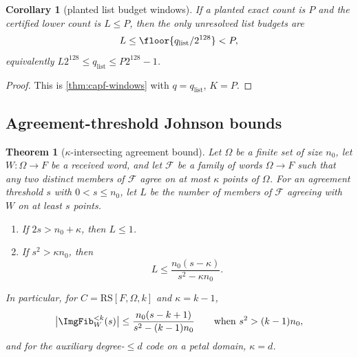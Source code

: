 \documentclass[11pt]{article}
\newtheorem{theorem}{Theorem}[section]
\newtheorem{corollary}[corollary]{Corollary}
\theoremstyle{definition}
\theoremstyle{remark}
\newcommand{\RS}{\mathrm{RS}}
\begin{document}
\begin{corollary}[planted list budget windows]\label{cor:capf-list-windows}
If a planted exact count is $P$ and the certified lower count is $L\le P$, then the only unresolved list budgets are
\[
        L\le \floor{q_{\mathrm{list}}/2^{128}}<P,
\]
equivalently $L2^{128}\le q_{\mathrm{list}}\le P2^{128}-1$.
\end{corollary}

\begin{proof}
This is \cref{thm:capf-windows} with $q=q_{\mathrm{list}}$, $K=P$.
\end{proof}

\subsection{Agreement-threshold Johnson bounds}

\begin{theorem}[$\kappa$-intersecting agreement bound]\label{thm:capf-johnson-list}
Let $\Omega$ be a finite set of size $n_0$, let $W:\Omega\to F$ be a received word, and let $\mathcal F$ be a family of words $\Omega\to F$ such that any two distinct members of $\mathcal F$ agree on at most $\kappa$ points of $\Omega$.  For an agreement threshold $s$ with $0<s\le n_0$, let $L$ be the number of members of $\mathcal F$ agreeing with $W$ on at least $s$ points.
\begin{enumerate}[label=\textup{(\roman*)}]
\item If $2s>n_0+\kappa$, then $L\le1$.
\item If $s^2>\kappa n_0$, then
\[
        L
        \le
        \frac{n_0(s-\kappa)}{s^2-\kappa n_0}.
\]
\end{enumerate}
In particular, for $C=\RS[F,\Omega,k]$ and $\kappa=k-1$,
\[
        \bigl|\ImgFib_W^{<k}(s)\bigr|\le\frac{n_0(s-k+1)}{s^2-(k-1)n_0}
        \qquad\text{when }s^2>(k-1)n_0,
\]
and for the auxiliary degree-$\le d$ code on a petal domain, $\kappa=d$.
\end{theorem}
\end{document}
